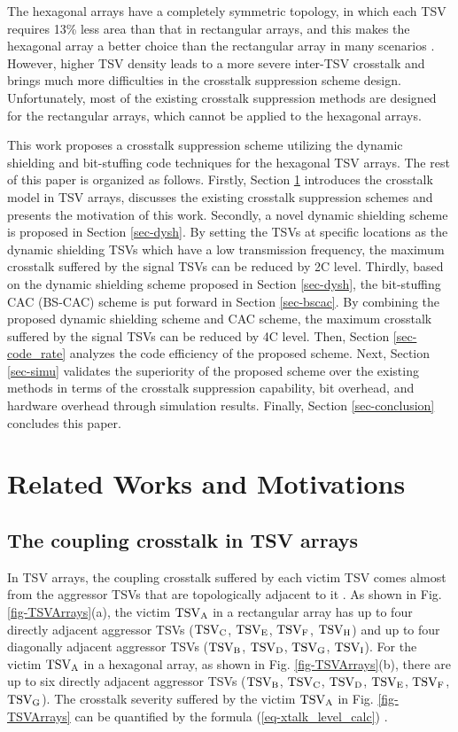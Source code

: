 \documentclass[lettersize,journal]{IEEEtran}
\begin{document}
The hexagonal arrays have a completely symmetric topology, in which each TSV requires 13\% less area than that in rectangular arrays, and this makes the hexagonal array a better choice than the rectangular array in many scenarios \cite{A04_Vaisband_7448908}. However, higher TSV density leads to a more severe inter-TSV crosstalk and brings much more difficulties in the crosstalk suppression scheme design. Unfortunately, most of the existing crosstalk suppression methods are designed for the rectangular arrays, which cannot be applied to the hexagonal arrays.

This work proposes a crosstalk suppression scheme utilizing the dynamic shielding and bit-stuffing code techniques for the hexagonal TSV arrays. The rest of this paper is organized as follows. Firstly, Section \ref{sec-pre} introduces the crosstalk model in TSV arrays, discusses the existing crosstalk suppression schemes and presents the motivation of this work. Secondly, a novel dynamic shielding scheme is proposed in Section \ref{sec-dysh}. By setting the TSVs at specific locations as the dynamic shielding TSVs which have a low transmission frequency, the maximum crosstalk suffered by the signal TSVs can be reduced by 2C level. Thirdly, based on the dynamic shielding scheme proposed in Section \ref{sec-dysh}, the bit-stuffing CAC (BS-CAC) scheme is put forward in Section \ref{sec-bscac}. By combining the proposed dynamic shielding scheme and CAC scheme, the maximum crosstalk suffered by the signal TSVs can be reduced by 4C level. Then, Section \ref{sec-code_rate} analyzes the code efficiency of the proposed scheme. Next, Section \ref{sec-simu} validates the superiority of the proposed scheme over the existing methods in terms of the crosstalk suppression capability, bit overhead, and hardware overhead through simulation results. Finally, Section \ref{sec-conclusion} concludes this paper.


\section{Related Works and Motivations}\label{sec-pre}
\subsection{The coupling crosstalk in TSV arrays}\label{subsec-pre-xtalkModel}
In TSV arrays, the coupling crosstalk suffered by each victim TSV comes almost from the aggressor TSVs that are topologically adjacent to it \cite{A04_Vaisband_7448908,A05_Kumar_6513784}. As shown in Fig. \ref{fig-TSVArrays}(a), the victim $\rm TSV_A$ in a rectangular array has up to four directly adjacent aggressor TSVs ($\rm TSV_C$, $\rm TSV_E$, $\rm TSV_F$, $\rm TSV_H$) and up to four diagonally adjacent aggressor TSVs ($\rm TSV_B$, $\rm TSV_D$, $\rm TSV_G$, $\rm TSV_I$). For the victim $\rm TSV_A$ in a hexagonal array, as shown in Fig. \ref{fig-TSVArrays}(b), there are up to six directly adjacent aggressor TSVs ($\rm TSV_B$, $\rm TSV_C$, $\rm TSV_D$, $\rm TSV_E$, $\rm TSV_F$, $\rm TSV_G$). The crosstalk severity suffered by the victim $\rm TSV_A$ in Fig. \ref{fig-TSVArrays} can be quantified by the formula (\ref{eq-xtalk_level_calc}) \cite{A04_Vaisband_7448908,A05_Kumar_6513784,A07_Song_7273940,A10_Cui_7851080}.
\end{document}
